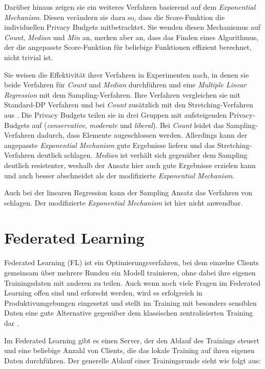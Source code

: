 Darüber hinaus zeigen sie ein weiteres Verfahren basierend auf dem \textit{Exponential Mechanism}. Diesen verändern sie dazu so, dass die Score-Funktion die individuellen Privacy Budgets mitbetrachtet. Sie wenden diesen Mechanismus auf \textit{Count}, \textit{Median} und \textit{Min} an, merken aber an, dass das Finden eines Algorithmus, der die angepasste Score-Funktion für beliebige Funktionen effizient berechnet, nicht trivial ist.

Sie weisen die Effektivität ihrer Verfahren in Experimenten nach, in denen sie beide Verfahren für \textit{Count} und \textit{Median} durchführen und eine \textit{Multiple Linear Regression} mit dem Sampling-Verfahren. Ihre Verfahren vergleichen sie mit Standard-DP Verfahren und bei \textit{Count} zusätzlich mit den Stretching-Verfahren aus \cite{alaggan:2016}. Die Privacy Budgets teilen sie in drei Gruppen mit aufsteigenden Privacy-Budgets auf (\textit{conservative}, \textit{moderate} und \textit{liberal}). Bei \textit{Count} leidet das Sampling-Verfahren dadurch, dass Elemente augeschlossen werden. Allerdings kann der angepasste \textit{Exponential Mechanism} gute Ergebnisse liefern und das Stretching-Verfahren deutlich schlagen. \textit{Median} ist verhält sich gegenüber dem Sampling deutlich resistenter, weshalb der Ansatz hier auch gute Ergebnisse erzielen kann und auch besser abschneidet als der modifizierte \textit{Exponential Mechanism}. 

Auch bei der linearen Regression kann der Sampling Ansatz das Verfahren von \cite{alaggan:2016} schlagen. Der modifizierte \textit{Exponential Mechanism} ist hier nicht anwendbar.

\section{Federated Learning}\label{fund-fl}

Federated Learning (FL) ist ein Optimierungsverfahren, bei dem einzelne Clients gemeinsam über mehrere Runden ein Modell trainieren, ohne dabei ihre eigenen Trainingsdaten mit anderen zu teilen. Auch wenn noch viele Fragen im Federated Learning offen sind und erforscht werden, wird es erfolgreich in Produktivumgebungen eingesetzt und stellt im Training mit besonders sensiblen Daten eine gute Alternative gegenüber dem klassischen zentralisierten Training dar \cite{hard:2018, ramaswamy:2020}.

Im Federated Learning gibt es einen Server, der den Ablauf des Trainings steuert und eine beliebige Anzahl von Clients, die das lokale Training auf ihren eigenen Daten durchführen. Der generelle Ablauf einer Trainingsrunde sieht wie folgt aus: 

